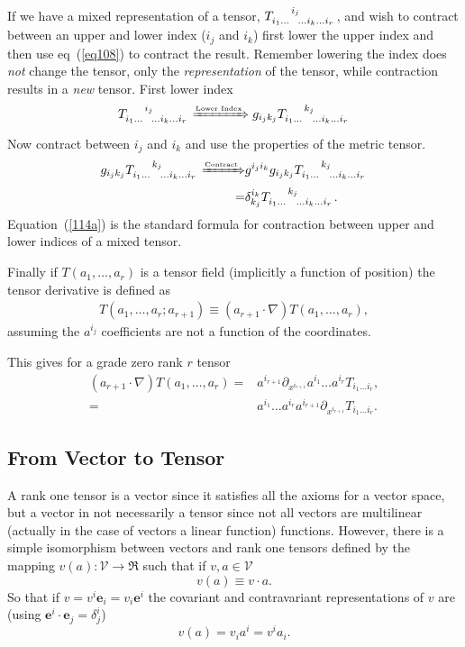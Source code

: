 \documentclass[12pt,twoside,openright]{memoir}
\newcommand{\bm}[1]{\boldsymbol{#1}}
\newcommand{\lp}{\left (}
\newcommand{\rp}{\right )}
\newcommand{\f}[2]{{#1}\lp {#2} \rp}
\newcommand{\be}{\begin{equation}}
\newcommand{\ee}{\end{equation}}
\newcommand{\eb}{\bm{e}}
\begin{document}
If we have a mixed representation of a tensor, $T\indices{_{i_{1}\dots}^{i_{j}}_{\dots i_{k}\dots i_{r}}}$, 
and wish to contract between an upper and lower index ($i_{j}$ and $i_{k}$) first lower the upper index and then use eq~(\ref{eq108})
to contract the result.  Remember lowering the index does \emph{not} change the tensor, only the \emph{representation} of the tensor,
while contraction results in a \emph{new} tensor.  First lower index
\be
	T\indices{_{i_{1}\dots}^{i_{j}}_{\dots i_{k}\dots i_{r}}} \xRightarrow{\mbox{\tiny Lower Index}} g_{i_{j}k_{j}}T\indices{_{i_{1}\dots}^{k_{j}}_{\dots i_{k}\dots i_{r}}}	
\ee
Now contract between $i_{j}$ and $i_{k}$ and use the properties of the metric tensor.
\begin{align}
	g_{i_{j}k_{j}}T\indices{_{i_{1}\dots}^{k_{j}}_{\dots i_{k}\dots i_{r}}} \xRightarrow{\mbox{\tiny Contract}}&
				g^{i_{j}i_{k}}g_{i_{j}k_{j}}T\indices{_{i_{1}\dots}^{k_{j}}_{\dots i_{k}\dots i_{r}}} \nonumber \\
				=& \delta_{k_{j}}^{i_{k}}T\indices{_{i_{1}\dots}^{k_{j}}_{\dots i_{k}\dots i_{r}}}. \label{114a}
\end{align}
Equation~(\ref{114a}) is the standard formula for contraction between upper and lower indices of a mixed tensor.

Finally if $\f{T}{a_{1},\dots,a_{r}}$ is a tensor field (implicitly a function of position) the tensor derivative is defined as
\begin{align}
	\f{T}{a_{1},\dots,a_{r};a_{r+1}} \equiv \lp a_{r+1}\cdot\nabla\rp\f{T}{a_{1},\dots,a_{r}},
\end{align}
assuming the $a^{i_{j}}$ coefficients are not a function of the coordinates.

This gives for a grade zero rank $r$ tensor
\begin{align}
	\lp a_{r+1}\cdot\nabla\rp\f{T}{a_{1},\dots,a_{r}} =& a^{i_{r+1}}\partial_{x^{i_{r+1}}}a^{i_{1}}\dots a^{i_{r}}
													    T_{i_{1}\dots i_{r}}, \nonumber \\
													 =& a^{i_{1}}\dots a^{i_{r}}a^{i_{r+1}}
													    \partial_{x^{i_{r+1}}}T_{i_{1}\dots i_{r}}. 
\end{align}

\subsection{From Vector to Tensor}

A rank one tensor is a vector since it satisfies all the axioms for a vector space, but a vector in not necessarily a tensor since not all vectors
are multilinear (actually in the case of vectors a linear function) functions.  However, there is a simple isomorphism between vectors and 
rank one tensors defined by the mapping $\f{v}{a}:\mathcal{V}\rightarrow\Re$ such that if $v,a \in\mathcal{V}$
\be
	\f{v}{a} \equiv v\cdot a.
\ee
So that if $v = v^{i}\eb_{i} = v_{i}\eb^{i}$ the covariant and contravariant representations of $v$ are 
(using $\eb^{i}\cdot\eb_{j} = \delta^{i}_{j}$)
\be
	\f{v}{a} = v_{i}a^{i} = v^{i}a_{i}.
\ee
\end{document}
